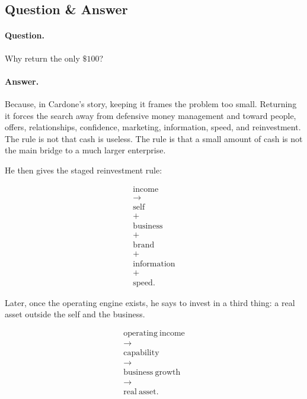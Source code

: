 \documentclass[11pt,oneside]{book}
\begin{document}
\subsection{Question \& Answer}

\paragraph{Question.}
Why return the only \(\$100\)?

\paragraph{Answer.}
Because, in Cardone's story, keeping it frames the problem too small. Returning it forces the search away from defensive money management and toward people, offers, relationships, confidence, marketing, information, speed, and reinvestment. The rule is not that cash is useless. The rule is that a small amount of cash is not the main bridge to a much larger enterprise.

He then gives the staged reinvestment rule:

\begin{equation}
\begin{gathered}
\mathrm{income}\\
\longrightarrow\\
\mathrm{self}\\
+\\
\mathrm{business}\\
+\\
\mathrm{brand}\\
+\\
\mathrm{information}\\
+\\
\mathrm{speed}.
\end{gathered}
\end{equation}

Later, once the operating engine exists, he says to invest in a third thing: a real asset outside the self and the business.

\begin{equation}
\begin{gathered}
\mathrm{operating\ income}\\
\longrightarrow\\
\mathrm{capability}\\
\longrightarrow\\
\mathrm{business\ growth}\\
\longrightarrow\\
\mathrm{real\ asset}.
\end{gathered}
\end{equation}
\end{document}
